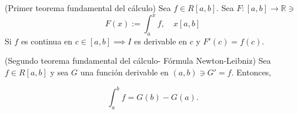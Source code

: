 \begin{teorema}(Primer teorema fundamental del cálculo)
	Sea $f\in R[a,b]$. Sea $F:[a,b]\to\mathbb{R}\ni$ 
	$$F(x):= \int_a^x f, \quad x[a,b]$$
	Si $f$ es continua en $c\in [a,b]\implies I$ es derivable en $c$ y $F'(c)=f(c)$. 
\end{teorema}

\begin{teorema}(Segundo teorema fundamental del cálculo- Fórmula Newton-Leibniz)
	Sea $f\in R[a,b]$ y sea $G$ una función derivable en $(a,b)\ni G'=f$. Entonces, 
	
	$$\int_a^b f=G(b)-G(a).$$
\end{teorema}
